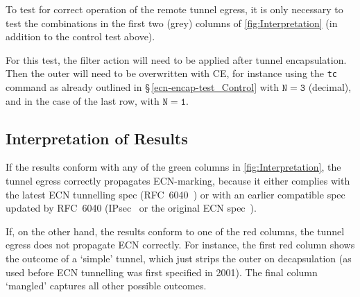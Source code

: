 To test for correct operation of the remote tunnel egress, it is only necessary
to test the combinations in the first two (grey) columns of
\autoref{fig:Interpretation} (in addition to the control test above).
%

For this test, the filter action will need to be applied after tunnel
encapsulation. Then the outer will need to be overwritten with CE, for instance
using the \texttt{tc} command as already outlined in
\S\,\ref{ecn-encap-test_Control} with \(\mathtt{N}=\mathtt{3}\) (decimal), and
in the case of the last row, with \(\mathtt{N}=\mathtt{1}\).

\subsection{Interpretation of Results}\label{ecn-encap-test_Interpretation}

If the results conform with any of the green columns in
\autoref{fig:Interpretation}, the tunnel egress correctly propagates
ECN-marking, because it either complies with the latest ECN tunnelling spec
(RFC~6040~\cite{Briscoe07b:ECN-tunnel}) or with an earlier compatible spec
updated by RFC~6040 (IPsec~\cite{IETF_RFC4301:IPSEC_architecture} or the
original ECN spec~\cite{rfc3168}).

If, on the other hand, the results conform to one of the red columns, the tunnel
egress does not propagate ECN correctly. For instance, the first red column
shows the outcome of a `simple' tunnel, which just strips the outer on
decapsulation (as used before ECN tunnelling was first specified in 2001). The
final column `mangled' captures all other possible outcomes.
